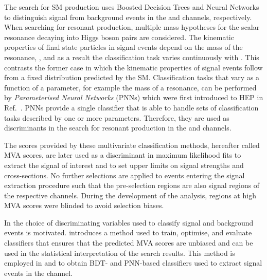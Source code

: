 The search for SM \HH production uses Boosted Decision Trees and
Neural Networks to distinguish signal from background events in the
\hadhad and \lephad channels, respectively. When searching for
resonant \HH production, multiple mass hypotheses for the scalar
resonance decaying into Higgs boson pairs are considered. The
kinematic properties of final state particles in signal events depend
on the mass of the resonance, \mX, and as a result the classification
task varies continuously with \mX. This contrasts the former case in
which the kinematic properties of signal events follow from a fixed
distribution predicted by the SM. Classification tasks that vary as a
function of a parameter, for example the mass of a resonance, can be
performed by \emph{Parameterised Neural Networks} (PNNs) which were first
introduced to HEP in Ref.~\cite{Baldi:2016fzo}. PNNs provide a single
classifier that is able to handle sets of classification tasks
described by one or more parameters. Therefore, they are used as
discriminants in the search for resonant \HH production in the \hadhad
and \lephad channels.

The scores provided by these multivariate classification methods,
hereafter called MVA scores, are later used as a discriminant in
maximum likelihood fits to extract the signal of interest and to set
upper limits on signal strengths and cross-sections. No further
selections are applied to events entering the signal extraction
procedure such that the pre-selection regions are also signal regions
of the respective channels. During the development of the analysis,
regions at high MVA scores were blinded to avoid selection biases.

In  the choice of
discriminating variables used to classify signal and background events
is motivated.  introduces a method used
to train, optimise, and evaluate classifiers that ensures that the
predicted MVA scores are unbiased and can be used in the statistical
interpretation of the search results. This method is employed in
 and  to obtain BDT- and
PNN-based classifiers used to extract signal events in the \hadhad
channel.



